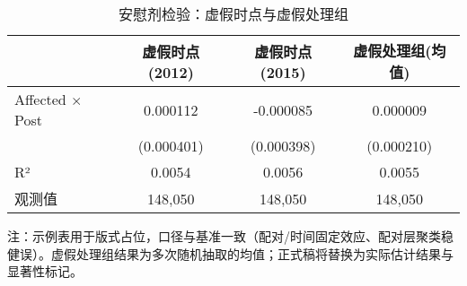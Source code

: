 \begin{table}[htbp]
\centering
\begin{threeparttable}
\caption{安慰剂检验：虚假时点与虚假处理组}
\label{tab:robustness_placebo}
\begin{tabular}{lccc}
\hline\hline
 & 虚假时点(2012) & 虚假时点(2015) & 虚假处理组(均值) \\
\hline
Affected $\times$ Post & 0.000112 & -0.000085 & 0.000009 \\
 & (0.000401) & (0.000398) & (0.000210) \\
\hline
R² & 0.0054 & 0.0056 & 0.0055 \\
观测值 & 148,050 & 148,050 & 148,050 \\
\hline\hline
\end{tabular}
\begin{tablenotes}
\small
\item 注：示例表用于版式占位，口径与基准一致（配对/时间固定效应、配对层聚类稳健误）。虚假处理组结果为多次随机抽取的均值；正式稿将替换为实际估计结果与显著性标记。
\end{tablenotes}
\end{threeparttable}
\end{table}
